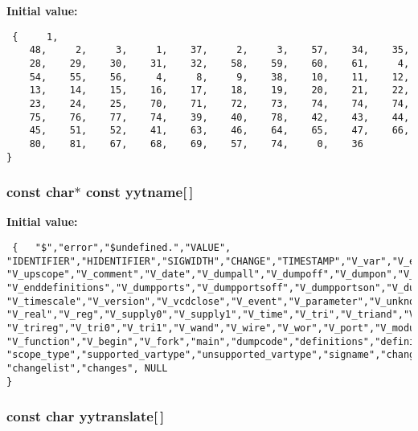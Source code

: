 {\bf Initial value:}

\footnotesize\begin{verbatim} {     1,
    48,     2,     3,     1,    37,     2,     3,    57,    34,    35,
    28,    29,    30,    31,    32,    58,    59,    60,    61,     4,
    54,    55,    56,     4,     8,     9,    38,    10,    11,    12,
    13,    14,    15,    16,    17,    18,    19,    20,    21,    22,
    23,    24,    25,    70,    71,    72,    73,    74,    74,    74,
    75,    76,    77,    74,    39,    40,    78,    42,    43,    44,
    45,    51,    52,    41,    63,    46,    64,    65,    47,    66,
    80,    81,    67,    68,    69,    57,    74,     0,    36
}\end{verbatim}\normalsize 
{}
\subsubsection{\setlength{\rightskip}{0pt plus 5cm}const char$\ast$ const yytname[$\,$]\hspace{0.3cm}{\tt  [static]}}\label{vcd__parser_8c_a87}


{\bf Initial value:}

\footnotesize\begin{verbatim} {   "$","error","$undefined.","VALUE",
"IDENTIFIER","HIDENTIFIER","SIGWIDTH","CHANGE","TIMESTAMP","V_var","V_end","V_scope",
"V_upscope","V_comment","V_date","V_dumpall","V_dumpoff","V_dumpon","V_dumpvars",
"V_enddefinitions","V_dumpports","V_dumpportsoff","V_dumpportson","V_dumpportsall",
"V_timescale","V_version","V_vcdclose","V_event","V_parameter","V_unknown","V_integer",
"V_real","V_reg","V_supply0","V_supply1","V_time","V_tri","V_triand","V_trior",
"V_trireg","V_tri0","V_tri1","V_wand","V_wire","V_wor","V_port","V_module","V_task",
"V_function","V_begin","V_fork","main","dumpcode","definitions","definition",
"scope_type","supported_vartype","unsupported_vartype","signame","changelists",
"changelist","changes", NULL
}\end{verbatim}\normalsize 
{}
\subsubsection{\setlength{\rightskip}{0pt plus 5cm}const char yytranslate[$\,$]\hspace{0.3cm}{\tt  [static]}}\label{vcd__parser_8c_a83}


